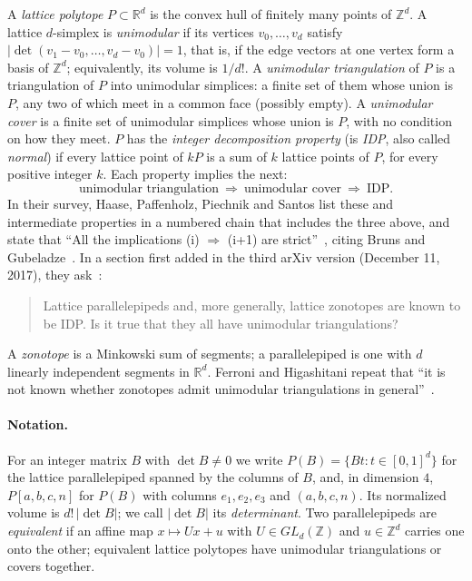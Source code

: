 \documentclass[11pt]{article}
\theoremstyle{definition}
\newcommand{\Z}{\mathbb{Z}}
\newcommand{\R}{\mathbb{R}}
\begin{document}
A \emph{lattice polytope} $P\subset\R^d$ is the convex hull of finitely many
points of $\Z^d$. A lattice $d$-simplex is \emph{unimodular} if its vertices
$v_0,\dots,v_d$ satisfy $|\det(v_1-v_0,\dots,v_d-v_0)|=1$, that is, if the
edge vectors at one vertex form a basis of $\Z^d$; equivalently, its volume
is $1/d!$. A \emph{unimodular triangulation} of $P$ is a triangulation of $P$
into unimodular simplices: a finite set of them whose union is $P$, any two
of which meet in a common face (possibly empty). A \emph{unimodular cover}
is a finite set of unimodular simplices whose union is $P$, with no
condition on how they meet. $P$ has the \emph{integer decomposition
property} (is \emph{IDP}, also called \emph{normal}) if every lattice point
of $kP$ is a sum of $k$ lattice points of $P$, for every positive integer
$k$. Each property implies the next:
\[
\text{unimodular triangulation}\ \Rightarrow\ \text{unimodular cover}\ \Rightarrow\ \text{IDP}.
\]
In their survey, Haase, Paffenholz, Piechnik and Santos list these and
intermediate properties in a numbered chain that includes the three above,
and state that ``All the implications (i) $\Rightarrow$ (i+1) are
strict''~\cite[p.~10]{HPPS}, citing Bruns and Gubeladze~\cite{BG}. In a
section first added in the third arXiv version (December 11, 2017), they
ask~\cite[\S1.5.4]{HPPS}:
\begin{quote}
Lattice parallelepipeds and, more generally, lattice zonotopes are known to
be IDP. Is it true that they all have unimodular triangulations?
\end{quote}
A \emph{zonotope} is a Minkowski sum of segments; a parallelepiped is one
with $d$ linearly independent segments in $\R^d$. Ferroni and Higashitani
repeat that ``it is not known whether zonotopes admit unimodular
triangulations in general''~\cite[\S6.1]{FH}.

\paragraph{Notation.}
For an integer matrix $B$ with $\det B\neq0$ we write
$P(B)=\{Bt: t\in[0,1]^d\}$ for the lattice parallelepiped spanned by the
columns of $B$, and, in dimension $4$, $P[a,b,c,n]$ for $P(B)$ with columns
$e_1,e_2,e_3$ and $(a,b,c,n)$. Its normalized volume is $d!\,|\det B|$; we
call $|\det B|$ its \emph{determinant}. Two parallelepipeds are
\emph{equivalent} if an affine map $x\mapsto Ux+u$ with $U\in GL_d(\Z)$ and
$u\in\Z^d$ carries one onto the other; equivalent lattice polytopes have
unimodular triangulations or covers together.
\end{document}
